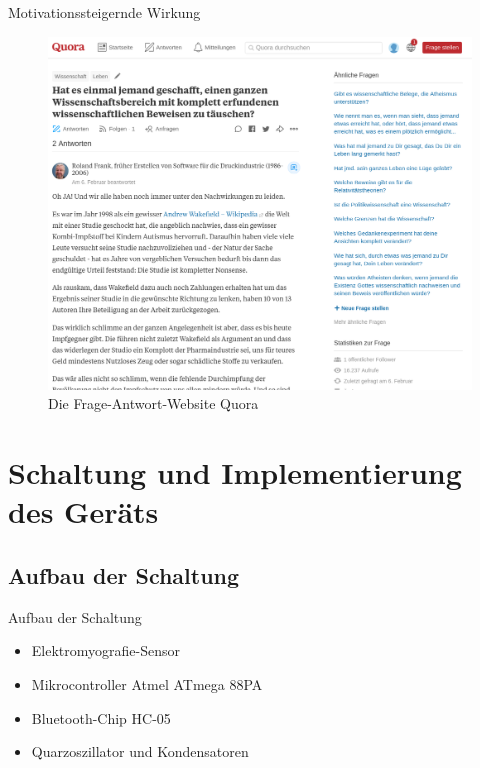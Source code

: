 \documentclass[hyphens]{beamer}
\begin{document}
\begin{frame}{Motivationssteigernde Wirkung}
\begin{figure}
	\includegraphics[scale=0.16]{pics/quora}
	\caption{Die Frage-Antwort-Website Quora}
\end{figure}
\end{frame}

\section{Schaltung und Implementierung des Geräts}

\subsection{Aufbau der Schaltung}

\begin{frame}{Aufbau der Schaltung}
	\begin{itemize}
		\item Elektromyografie-Sensor
		\item Mikrocontroller Atmel ATmega 88PA
		\item Bluetooth-Chip HC-05
		\item Quarzoszillator und Kondensatoren
	\end{itemize}
\end{frame}
\end{document}
